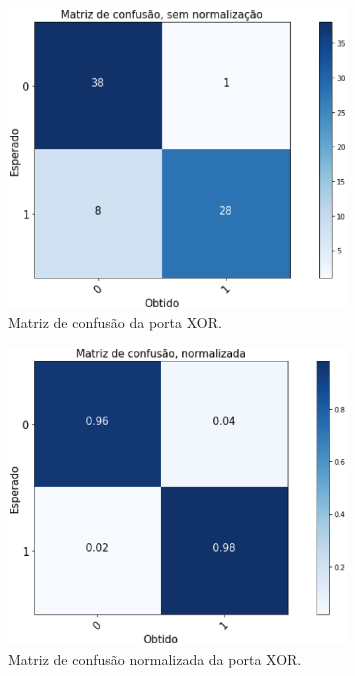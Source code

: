 \begin{figure}[!htb]
	\centering
	\includegraphics[width=0.8\textwidth]{figuras/mcxor.eps}
	\caption{Matriz de confusão da porta XOR.}
	\label{mcxor}
\end{figure}

\begin{figure}[!htb]
	\centering
	\includegraphics[width=0.8\textwidth]{figuras/mcxornormalizada.eps}
	\caption{Matriz de confusão normalizada da porta XOR.}
	\label{mcxornormalizada}
\end{figure}

